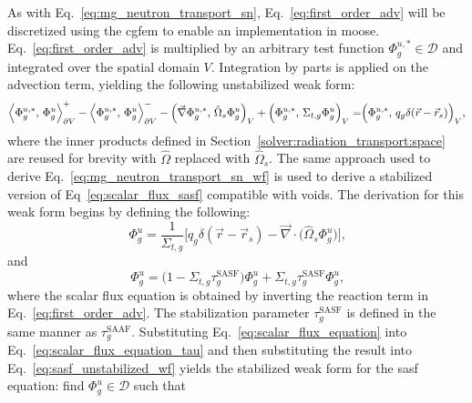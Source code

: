 As with Eq.~\ref{eq:mg_neutron_transport_sn}, Eq.~\ref{eq:first_order_adv} will be discretized using the \acrshort{cgfem} to enable an implementation in \acrshort{moose}. Eq.~\ref{eq:first_order_adv} is multiplied by an arbitrary test function $\Phi^{u,*}_{g}\in \mathcal{D}$ and integrated over the spatial domain $V$. Integration by parts is applied on the advection term, yielding the following unstabilized weak form:
\begin{equation}\label{eq:sasf_unstabilized_wf}
    \Bigl\langle\Phi^{u,*}_{g},\,\Phi^{u}_{g}\Bigr\rangle^{+}_{\partial V}
    - \Bigl\langle\Phi^{u,*}_{g},\,\Phi^{u}_{g}\Bigr\rangle^{-}_{\partial V} 
    - \Bigl(\vec{\nabla}\Phi^{u,*}_{g},\,\hat{\Omega}_{s}\Phi^{u}_{g}\Bigr)_{V} 
    + \Bigl(\Phi^{u,*}_{g},\,\Sigma_{t,g}\Phi^{u}_{g}\Bigr)_{V} = \Bigr(\Phi^{u,*}_{g},\,q_{g}\delta(\vec{r} - \vec{r}_{s})\Bigl)_{V}\text{,}
\end{equation}
where the inner products defined in Section~\ref{solver:radiation_transport:space} are reused for brevity with $\hat{\Omega}$ replaced with $\hat{\Omega}_{s}$. The same approach used to derive Eq.~\ref{eq:mg_neutron_transport_sn_wf} is used to derive a stabilized version of Eq~\ref{eq:scalar_flux_sasf} compatible with voids. The derivation for this weak form begins by defining the following: 
\begin{equation}\label{eq:scalar_flux_equation}
    \Phi^{u}_{g} = \frac{1}{\Sigma_{t,g}}\Big[q_{g}\delta(\vec{r} - \vec{r}_{s}) - \vec{\nabla}\cdot\Big(\hat{\Omega}_{s}\Phi^{u}_{g}\Big)\Big]\text{,}
\end{equation}
and
\begin{equation}\label{eq:scalar_flux_equation_tau}
    \Phi^{u}_{g} = \Big(1 - \Sigma_{t,g}\tau^{\text{SASF}}_{g}\Big)\Phi^{u}_{g} + \Sigma_{t,g}\tau^{\text{SASF}}_{g}\Phi^{u}_{g}\text{,}
\end{equation}
where the scalar flux equation is obtained by inverting the reaction term in Eq.~\ref{eq:first_order_adv}. The stabilization parameter $\tau^{\text{SASF}}_{g}$ is defined in the same manner as $\tau^{\text{SAAF}}_{g}$. Substituting Eq.~\ref{eq:scalar_flux_equation} into Eq.~\ref{eq:scalar_flux_equation_tau} and then substituting the result into Eq.~\ref{eq:sasf_unstabilized_wf} yields the stabilized weak form for the \acrshort{sasf} equation: find $\Phi^{u}_{g}\in\mathcal{D}$ such that
